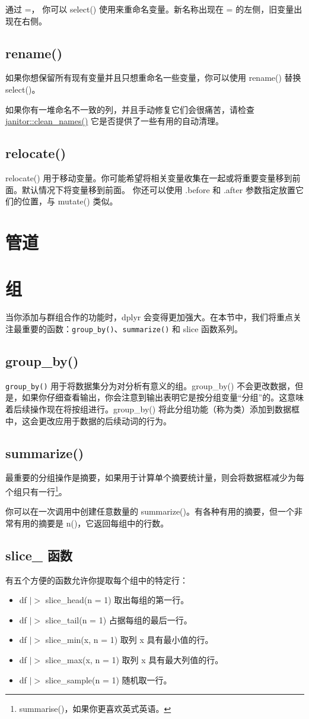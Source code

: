 通过 =， 你可以 select() 使用来重命名变量。新名称出现在 = 的左侧，旧变量出现在右侧。

\subsection{rename()}
如果你想保留所有现有变量并且只想重命名一些变量，你可以使用 rename() 替换 select()。

如果你有一堆命名不一致的列，并且手动修复它们会很痛苦，请检查 \href{https://sfirke.github.io/janitor/reference/clean_names.html}{janitor::clean\_names()} 它是否提供了一些有用的自动清理。
\subsection{relocate()}
relocate() 用于移动变量。你可能希望将相关变量收集在一起或将重要变量移到前面。默认情况下将变量移到前面。 你还可以使用 .before 和 .after 参数指定放置它们的位置，与 mutate() 类似。
\section{管道}
\section{组}
当你添加与群组合作的功能时，dplyr 会变得更加强大。在本节中，我们将重点关注最重要的函数：\verb|group_by()|、\verb|summarize()| 和 slice 函数系列。
\subsection{group\_by()}
\verb|group_by()| 用于将数据集分为对分析有意义的组。group\_by() 不会更改数据，但是，如果你仔细查看输出，你会注意到输出表明它是按分组变量“分组”的。这意味着后续操作现在将按组进行。group\_by() 将此分组功能（称为类）添加到数据框中，这会更改应用于数据的后续动词的行为。

\subsection{summarize()}
最重要的分组操作是摘要，如果用于计算单个摘要统计量，则会将数据框减少为每个组只有一行\footnote{summarise()，如果你更喜欢英式英语。}。

你可以在一次调用中创建任意数量的 summarize()。有各种有用的摘要，但一个非常有用的摘要是 n()，它返回每组中的行数。
\subsection{slice\_ 函数}
有五个方便的函数允许你提取每个组中的特定行：
\begin{itemize}
    \item df $|>$ slice\_head(n = 1) 取出每组的第一行。
    \item df $|>$ slice\_tail(n = 1) 占据每组的最后一行。
    \item df $|>$ slice\_min(x, n = 1) 取列 x 具有最小值的行。
    \item df $|>$ slice\_max(x, n = 1) 取列 x 具有最大列值的行。
    \item df $|>$ slice\_sample(n = 1) 随机取一行。
\end{itemize}

